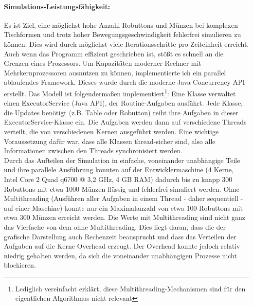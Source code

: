 \paragraph{Simulations-Leistungsfähigkeit:}
Es ist Ziel, eine möglichst hohe Anzahl Robuttons und Münzen bei komplexen Tischformen und trotz hoher Bewegungsgeschwindigkeit fehlerfrei simulieren zu können.
Dies wird durch möglichst viele Iterationsschritte pro Zeiteinheit erreicht. Auch wenn das Programm effizient geschrieben ist,
stößt es schnell an die Grenzen eines Prozessors. Um Kapazitäten moderner Rechner mit Mehrkernprozessoren ausnutzen zu können,
implementierte ich ein parallel ablaufendes Framework. Dieses wurde durch die moderne Java Concurrency API erstellt.
Das Modell ist folgendermaßen implementiert\footnote{Lediglich vereinfacht erklärt, diese Multithreading-Mechanismen sind für den eigentlichen Algorithmus nicht relevant}:
Eine Klasse verwaltet einen ExecutorService (Java API), der Routine-Aufgaben ausführt.
Jede Klasse, die Updates benötigt (z.B. Table oder Robutton) reiht ihre Aufgaben in dieser ExecutorService-Klasse ein.
Die Aufgaben werden dann auf verschiedene Threads verteilt, die von verschiedenen Kernen ausgeführt werden. Eine wichtige Voraussetzung dafür war,
dass alle Klassen thread-sicher sind, also alle Informationen zwischen den Threads synchronisiert werden.\\
Durch das Aufteilen der Simulation in einfache, voneinander unabhängige Teile und ihre parallele Ausführung konnten
auf der Entwicklermaschine (4 Kerne, Intel Core 2 Quad q6700 @ 3,2 GHz, 4 GB RAM) dadurch bis zu knapp 300 Robuttons mit etwa 1000 Münzen
flüssig und fehlerfrei simuliert werden.
Ohne Multithreading (Ausführen aller Aufgaben in einem Thread - daher sequentiell - auf einer Maschine)
konnte nur ein Maximalanzahl von etwa 100 Robuttons mit etwa 300 Münzen erreicht werden.
Die Werte mit Multithreading sind nicht ganz das Vierfache von dem ohne Multithreading.
Dies liegt daran, dass die der grafische Darstellung auch Rechenzeit beansprucht und dass das Verteilen der Aufgaben auf die Kerne Overhead erzeugt.
Der Overhead konnte jedoch relativ niedrig gehalten werden, da sich die voneinander unabhängigen Prozesse nicht blockieren.
